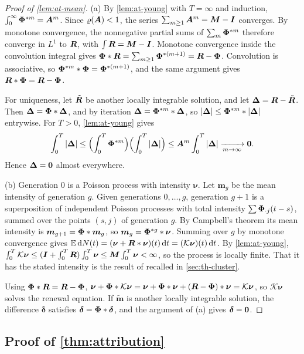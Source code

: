 \begin{proof}[Proof of \cref{lem:at-mean}]

(a) By \cref{lem:at-young} with $T=\infty$ and induction,
$\int_0^\infty\bm{\Phi}^{*m}=\bm{A}^m$. Since $\varrho(\bm{A})<1$, the series
$\sum_{m\ge1}\bm{A}^m=\bm{M}-\bm{I}$ converges. By monotone convergence, the nonnegative
partial sums of $\sum_m\bm{\Phi}^{*m}$ therefore converge in $L^1$ to $\bm{R}$, with
$\int\bm{R}=\bm{M}-\bm{I}$. Monotone convergence inside the convolution integral gives
$\bm{\Phi}*\bm{R}=\sum_{m\ge1}\bm{\Phi}^{*(m+1)}=\bm{R}-\bm{\Phi}$. Convolution is associative, so
$\bm{\Phi}^{*m}*\bm{\Phi}=\bm{\Phi}^{*(m+1)}$, and the same argument gives $\bm{R}*\bm{\Phi}=\bm{R}-\bm{\Phi}$.

For uniqueness, let $\tilde{\bm{R}}$ be another locally integrable solution, and let
$\bm\Delta=\bm{R}-\tilde{\bm{R}}$. Then $\bm\Delta=\bm{\Phi}*\bm\Delta$, and by iteration
$\bm\Delta=\bm{\Phi}^{*m}*\bm\Delta$, so $|\bm\Delta|\le\bm{\Phi}^{*m}*|\bm\Delta|$ entrywise. For
$T>0$, \cref{lem:at-young} gives
\[
\int_0^T|\bm\Delta|\le\Bigl(\int_0^T\bm{\Phi}^{*m}\Bigr)\Bigl(\int_0^T|\bm\Delta|\Bigr)
\le\bm{A}^m\int_0^T|\bm\Delta|\xrightarrow[m\to\infty]{}\mathbf{0} .
\]
Hence $\bm\Delta=\mathbf{0}$ almost everywhere.

(b) Generation $0$ is a Poisson process with intensity $\bm\nu$. Let $\bm m_g$ be the
mean intensity of generation $g$. Given generations $0,\dots,g$, generation $g+1$ is a
superposition of independent Poisson processes with total intensity
$\sum\bm{\Phi}_{\cdot j}(t-s)$, summed over the points $(s,j)$ of generation $g$. By
Campbell's theorem its mean intensity is $\bm m_{g+1}=\bm{\Phi}*\bm m_g$, so
$\bm m_g=\bm{\Phi}^{*g}*\bm\nu$. Summing over $g$ by monotone convergence gives
$\mathbb{E}\,\mathrm{d}N(t)=(\bm\nu+\bm{R}*\bm\nu)(t)\,\mathrm{d} t=(\mathcal K\bm\nu)(t)\,\mathrm{d} t$. By
\cref{lem:at-young},
$\int_0^T\mathcal K\bm\nu\le(\bm{I}+\int_0^T\bm{R})\int_0^T\bm\nu\le\bm{M}\int_0^T\bm\nu<\infty$,
so the process is locally finite. That it has the stated intensity is the result of
\citet{hawkes1974} recalled in \cref{sec:th-cluster}.

Using $\bm{\Phi}*\bm{R}=\bm{R}-\bm{\Phi}$,
$\bm\nu+\bm{\Phi}*\mathcal K\bm\nu=\bm\nu+\bm{\Phi}*\bm\nu+(\bm{R}-\bm{\Phi})*\bm\nu=\mathcal K\bm\nu$,
so $\mathcal K\bm\nu$ solves the renewal equation. If $\tilde{\bm m}$ is another
locally integrable solution, the difference $\bm\delta$ satisfies $\bm\delta=\bm{\Phi}*\bm\delta$,
and the argument of (a) gives $\bm\delta=\mathbf{0}$.
\end{proof}

\subsection{Proof of \texorpdfstring{\cref{thm:attribution}}{the attribution theorem}}\label{app:at-thm}

